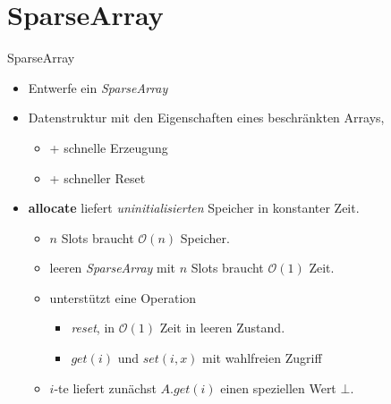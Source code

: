 \documentclass[18pt]{beamer}
\newcommand{\Oh}{\mathcal{O}}
\begin{document}
\section{SparseArray}
\begin{frame}{SparseArray}
\begin{itemize}
 \item 	Entwerfe ein \textit{SparseArray} 
 \item 	Datenstruktur mit den Eigenschaften eines beschränkten Arrays, 
  \begin{itemize}
   \item + schnelle Erzeugung
   \item + schneller Reset
  \end{itemize}
 \item \textbf{allocate} liefert \emph{uninitialisierten} Speicher in konstanter Zeit.
	\begin{itemize}
	\item $n$ Slots braucht $\Oh(n)$ Speicher.
	\item leeren \textit{SparseArray} mit $n$ Slots braucht $\Oh(1)$ Zeit. 
	\item unterstützt eine Operation
	\begin{itemize}
	 \item \textit{reset}, in $\Oh(1)$ Zeit in leeren Zustand.
	 \item $\mathit{get}(i)$ und $\mathit{set}(i,x)$ mit wahlfreien Zugriff
	\end{itemize}
	\item $i$-te liefert zunächst $A.\mathit{get}(i)$ einen speziellen Wert $\bot$.
	\end{itemize}
\end{itemize}
 
\end{frame}
\end{document}
